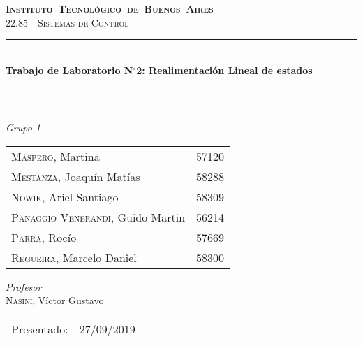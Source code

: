 \begin{titlepage}
\newcommand{\HRule}{\rule{\linewidth}{0.5mm}}
\center
\mbox{\textsc{\LARGE \bfseries {Instituto Tecnol\'ogico de Buenos Aires}}}\\[1.5cm]
\textsc{\Large 22.85 - Sistemas de Control}\\[0.5cm]


\HRule \\[0.6cm]
{ \Huge \bfseries Trabajo de Laboratorio N$^{\circ}$2: Realimentación Lineal de estados}\\[0.4cm] %
\HRule \\[1.5cm]


{\large

\emph{Grupo 1}\\
\vspace{3px}

\begin{tabular}{lr} 	
\textsc{M\'aspero}, Martina  & 57120 \\
\textsc{Mestanza}, Joaqu\'in Mat\'ias  & 58288 \\
\textsc{Nowik}, Ariel Santiago  & 58309 \\
\textsc{Panaggio Venerandi}, Guido Martin  & 56214 \\
\textsc{Parra}, Roc\'io  & 57669 \\
\textsc{Regueira}, Marcelo Daniel  & 58300 \\

\end{tabular}

\vspace{20px}

\emph{Profesor}\\
\vspace{3px}
\textsc{Nasini}, V\'ictor Gustavo\\ 	
\vspace{100px}

\begin{tabular}{ll}

Presentado: & 27/09/2019\\

\end{tabular}

}

\vfill

\end{titlepage}